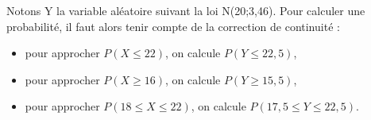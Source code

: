 \documentclass[a4paper,12pt,openany]{book}
\begin{document}
Notons Y la variable aléatoire suivant la loi N(20;3,46).
Pour calculer une probabilité, il faut alors tenir compte de la correction de continuité :
\begin{itemize}

	\item[$\bullet$]  pour approcher $P(X\le 22)$, on calcule $P(Y\le 22,5)$,
	\item[$\bullet$]  pour approcher $P(X\geq 16)$, on calcule $P(Y\geq 15,5)$,
	\item[$\bullet$]  pour approcher $P(18\le X\le 22)$, on calcule $P(17,5\le Y\le 22,5)$.
\end{itemize}
\end{document}

